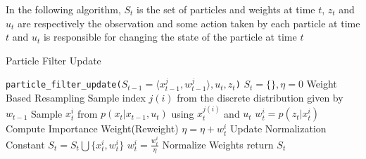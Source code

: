 \documentclass[12pt,letterpaper]{article}
\begin{document}
\begin{algorithm}[h!]
In the following algorithm, $S_t$ is the set of particles and weights at time $t$, $z_t$ and $u_t$ are respectively the observation and some action taken by each particle at time $t$ and $u_t$ is responsible for changing the state of the particle at time $t$
   \caption{Particle Filter Update}
    \begin{algorithmic}[1a]
      \Function\texttt{particle\_filter\_update({$S_{t-1}=\langle x_{t-1}^{j},w_{t-1}^{j}\rangle,u_t,z_t$})}
        \State $S_t = \{\}, \eta = 0$
         \hspace{5mm} Weight Based Resampling
            \State Sample index $j(i)$ from the discrete distribution given by $w_{t-1}$ 
            \State Sample $x_{t}^i$ from $p(x_{t}|x_{t-1},u_t)$ using $x_{t}^{j(i)}$ and $u_t$
            \State $w_{t}^{i}=p(z_{t}|x_{t}^{i})$ \hspace{6mm} Compute Importance Weight(Reweight)
            \State $\eta=\eta+w_{t}^{i}$ \hspace{10mm} Update Normalization Constant
            \State $S_t = S_t \bigcup \{x_t^{i},w_t^{i}\}$
        \EndFor
            \State $w_{t}^i=\frac{w_{t}^i}{\eta}$ \hspace{14mm} Normalize Weights
        \EndFor
        \State return $S_t$
        \EndFunction   
    \end{algorithmic}
\end{algorithm}
\end{document}
